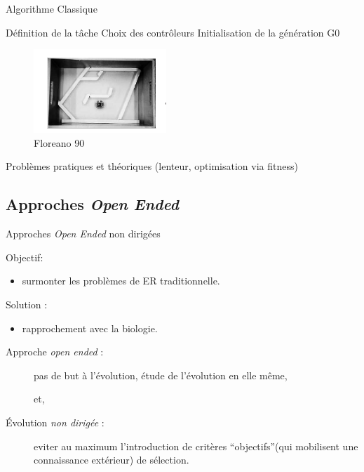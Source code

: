 \documentclass[8pt, handout=show,notes=show]{beamer}
\begin{document}
\begin{frame}{Algorithme Classique}
	\begin{algorithm}[H]
		\dontprintsemicolon 
		\caption{Un Algorithme classique de Robotique \'Evolutionnaire}\label{alg:RE}
		Définition de la tâche \;
		Choix des contrôleurs \;
		Initialisation de la génération G0 \;
	\end{algorithm}

	\vfill
	\begin{figure}[h]
		\begin{center}
			\includegraphics[width=5cm]{images/oldERfloreano.png}
		\end{center}
		\caption{Floreano 90}
	\end{figure}
	\vfill
	Problèmes pratiques et théoriques (lenteur, optimisation via fitness)


\end{frame}
\subsection{Approches \emph{Open Ended}}
\begin{frame}{Approches \emph{Open Ended} non dirigées}

	Objectif:
	\begin{itemize}
		\item surmonter les problèmes de ER traditionnelle.
	\end{itemize}

	Solution :
	\begin{itemize}
		\item rapprochement avec la biologie.
	\end{itemize}

	\vfill

	\begin{description}
		\item[Approche \emph{open ended} :] pas de but à l'évolution, étude de l'évolution en elle même,
			\begin{center}
				et,\\
			\end{center}
		\item[\'Evolution \emph{non dirigée} :] eviter au maximum l'introduction de critères ``objectifs''(qui mobilisent une connaissance extérieur) de sélection.
	\end{description}


	
\end{frame}
\end{document}
